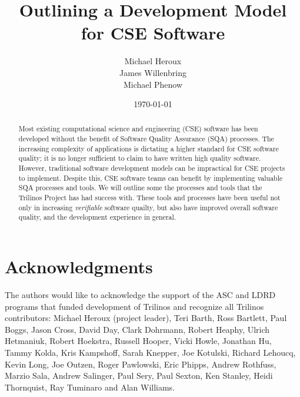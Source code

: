 \documentclass[12pt,relax]{article}
\title{Outlining a Development Model for CSE Software}
\author{
Michael Heroux\\
James Willenbring\\
Michael Phenow\\
}
\date{\today} %
\begin{document}
\maketitle


\begin{abstract}

Most existing computational science and engineering (CSE) software has been 
developed without the benefit of Software Quality Assurance (SQA) processes.
The increasing complexity of applications is dictating a higher standard for 
CSE software quality; it is no longer sufficient to claim to have 
written high quality software.  However, traditional
software development models can be impractical for CSE projects to implement.
Despite this, CSE software teams can benefit by implementing
valuable SQA processes and tools.  We will outline some the
processes and tools that the Trilinos Project has had success with.  These 
tools and processes have been useful not only in increasing 
\textit{verifiable} software quailty, but also have improved 
overall software quality, and the development experience in 
general.

\end{abstract}

\clearpage


\section*{Acknowledgments}

The authors would like to acknowledge the support of the ASC and LDRD programs 
that funded development of Trilinos and recognize all Trilinos contributors:
Michael Heroux (project leader), Teri Barth, Ross Bartlett, Paul Boggs, Jason
Cross, David Day, Clark Dohrmann, Robert Heaphy, Ulrich Hetmaniuk, Robert
Hoekstra, Russell Hooper, Vicki Howle, Jonathan Hu, Tammy Kolda, Kris
Kampshoff, Sarah Knepper, Joe Kotulski, Richard Lehoucq, Kevin Long, Joe
Outzen, Roger Pawlowski, Eric Phipps, Andrew Rothfuss, Marzio Sala, Andrew
Salinger, Paul Sery, Paul Sexton, Ken Stanley, Heidi Thornquist, Ray Tuminaro
and Alan Williams.

\clearpage
\tableofcontents

\clearpage
\end{document}

